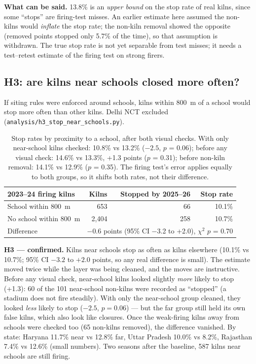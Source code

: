 \documentclass[11pt,a4paper]{article}
\begin{document}
\textbf{What can be said.} 13.8\% is an \emph{upper bound} on the stop rate of
real kilns, since some ``stops'' are firing-test misses. An earlier estimate
here assumed the non-kilns would \emph{inflate} the stop rate; the non-kiln
removal showed the opposite (removed points stopped only 5.7\% of the time), so
that assumption is withdrawn. The true stop rate is not yet separable from test
misses; it needs a test--retest estimate of the firing test on strong firers.

\subsection{H3: are kilns near schools closed more often?}
If siting rules were enforced around schools, kilns within 800~m of a school
would stop more often than other kilns. Delhi NCT excluded
(\texttt{analysis/h3\_stop\_near\_schools.py}).

\begin{table}[H]
\centering\small
\begin{tabular}{@{}lrrr@{}}
\toprule
2023--24 firing kilns & Kilns & Stopped by 2025--26 & Stop rate \\
\midrule
School within 800~m    & 653     & 66  & 10.1\% \\
No school within 800~m & 2{,}404 & 258 & 10.7\% \\
\midrule
Difference & \multicolumn{3}{r}{$-$0.6 points (95\% CI $-$3.2 to +2.0), $\chi^2$ $p$ = 0.70} \\
\bottomrule
\end{tabular}
\caption{Stop rates by proximity to a school, after both visual checks. With
only near-school kilns checked: 10.8\% vs 13.2\% ($-2.5$, $p$ = 0.06); before any
visual check: 14.6\% vs 13.3\%, +1.3 points ($p$ = 0.31); before non-kiln removal:
14.1\% vs 12.9\% ($p$ = 0.35). The firing test's
error applies equally to both groups, so it shifts both rates, not their
difference.}
\end{table}

\textbf{H3 --- confirmed.} Kilns near schools stop as often as kilns elsewhere
(10.1\% vs 10.7\%; 95\% CI $-3.2$ to $+2.0$ points, so any real difference is
small). The estimate moved twice while the layer was being cleaned, and the moves
are instructive. Before any visual check, near-school kilns looked slightly
\emph{more} likely to stop (+1.3): 60 of the 101 near-school non-kilns were
recorded as ``stopped'' (a stadium does not fire steadily). With only the
near-school group cleaned, they looked \emph{less} likely to stop ($-2.5$,
$p = 0.06$) --- but the far group still held its own false kilns, which also look
like closures. Once the weak-firing kilns away from schools were checked too (65
non-kilns removed), the difference vanished. By state: Haryana 11.7\% near vs
12.8\% far, Uttar Pradesh 10.0\% vs 8.2\%, Rajasthan 7.4\% vs 12.6\% (small
numbers). Two seasons after the baseline, 587 kilns near schools are still firing.
\end{document}
